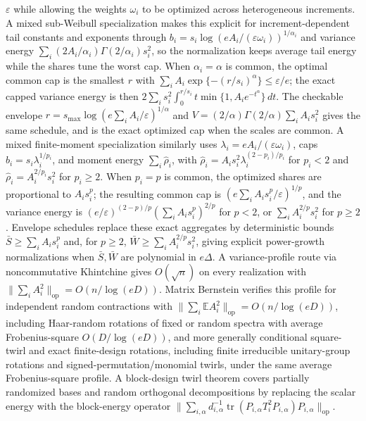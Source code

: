 \documentclass[11pt]{article}
\begin{document}
\(\varepsilon\) while allowing the weights \(\omega_i\) to be optimized across
heterogeneous increments.
A mixed sub-Weibull specialization makes this explicit for increment-dependent
tail constants and exponents through
\(b_i=s_i\log(eA_i/(\varepsilon\omega_i))^{1/\alpha_i}\) and variance energy
\(\sum_i(2A_i/\alpha_i)\Gamma(2/\alpha_i)s_i^2\), so the normalization keeps
average tail energy while the shares tune the worst cap.
When \(\alpha_i=\alpha\) is common, the optimal common cap is the smallest
\(r\) with \(\sum_iA_i\exp\{-(r/s_i)^\alpha\}\le\varepsilon/e\); the exact
capped variance energy is then
\(2\sum_i s_i^2\int_0^{r/s_i}t\min\{1,A_ie^{-t^\alpha}\}\,dt\).
The checkable envelope \(r=s_{\max}\log(e\sum_iA_i/\varepsilon)^{1/\alpha}\)
and \(V=(2/\alpha)\Gamma(2/\alpha)\sum_iA_is_i^2\) gives the same schedule,
and is the exact optimized cap when the scales are common.
A mixed finite-moment specialization similarly uses
\(\lambda_i=eA_i/(\varepsilon\omega_i)\), caps
\(b_i=s_i\lambda_i^{1/p_i}\), and moment energy
\(\sum_i\widehat\rho_i\), with
\(\widehat\rho_i=A_is_i^2\lambda_i^{(2-p_i)/p_i}\) for \(p_i<2\) and
\(\widehat\rho_i=A_i^{2/p_i}s_i^2\) for \(p_i\ge2\).
When \(p_i=p\) is common, the optimized shares are proportional to
\(A_is_i^p\); the resulting common cap is
\((e\sum_iA_is_i^p/\varepsilon)^{1/p}\), and the variance energy is
\((e/\varepsilon)^{(2-p)/p}(\sum_iA_is_i^p)^{2/p}\) for \(p<2\), or
\(\sum_iA_i^{2/p}s_i^2\) for \(p\ge2\).
Envelope schedules replace these exact aggregates by deterministic bounds
\(\bar S\ge\sum_iA_is_i^p\) and, for \(p\ge2\),
\(\bar W\ge\sum_iA_i^{2/p}s_i^2\), giving explicit power-growth
normalizations when \(\bar S,\bar W\) are polynomial in \(e\Delta\).
A variance-profile route
via noncommutative Khintchine gives \(O(\sqrt n)\) on every realization with
\(\|\sum_i A_i^2\|_{\mathrm{op}}=O(n/\log(eD))\).  Matrix Bernstein verifies this
profile for independent random contractions with
\(\|\sum_i\mathbb E A_i^2\|_{\mathrm{op}}=O(n/\log(eD))\), including
Haar-random rotations of fixed or random spectra with average Frobenius-square
\(O(D/\log(eD))\), and more generally conditional square-twirl and exact
finite-design rotations, including finite irreducible unitary-group rotations
and signed-permutation/monomial twirls, under the same average
Frobenius-square profile.  A block-design twirl theorem covers partially
randomized bases and random orthogonal decompositions by replacing the scalar
energy with the block-energy operator
\(\|\sum_{i,\alpha}d_{i,\alpha}^{-1}
\operatorname{tr}(P_{i,\alpha}T_i^2P_{i,\alpha})P_{i,\alpha}\|_{\mathrm{op}}\).
\end{document}

